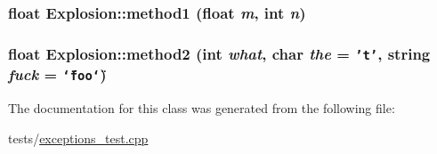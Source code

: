 \hypertarget{classExplosion_13a5482f594ed43298471590cff1c9cb}{
\subsubsection[{method1}]{\setlength{\rightskip}{0pt plus 5cm}float Explosion::method1 (float {\em m}, \/  int {\em n})}}
\label{classExplosion_13a5482f594ed43298471590cff1c9cb}


\hypertarget{classExplosion_dd9aefd63978127ed3c8a0265aa9c77b}{
\subsubsection[{method2}]{\setlength{\rightskip}{0pt plus 5cm}float Explosion::method2 (int {\em what}, \/  char {\em the} = {\tt 't'}, \/  string {\em fuck} = {\tt \char`\"{}foo\char`\"{}})}}
\label{classExplosion_dd9aefd63978127ed3c8a0265aa9c77b}




The documentation for this class was generated from the following file:\begin{CompactItemize}
\item 
tests/\hyperlink{exceptions__test_8cpp}{exceptions\_\-test.cpp}\end{CompactItemize}
